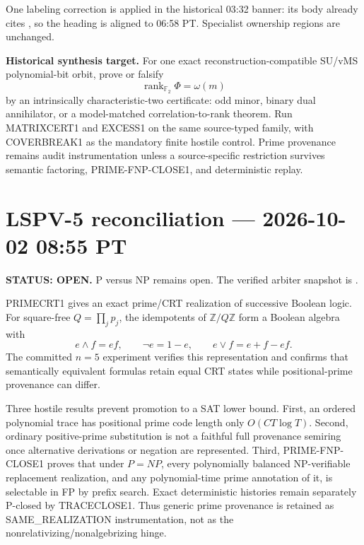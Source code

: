 \documentclass[11pt]{article}
\begin{document}
One labeling correction is applied in the historical 03:32 banner: its body already cites
, so the heading is aligned to 06:58 PT.
Specialist ownership regions are unchanged.

\begin{candidatebox}
\textbf{Historical synthesis target.}
For one exact reconstruction-compatible SU/vMS polynomial-bit orbit, prove or falsify
\[
\operatorname{rank}_{\mathbb F_2}\Phi=\omega(m)
\]
by an intrinsically characteristic-two certificate: odd minor, binary dual annihilator, or a
model-matched correlation-to-rank theorem. Run MATRIXCERT1 and EXCESS1 on the same source-typed
family, with COVERBREAK1 as the mandatory finite hostile control. Prime provenance remains audit
instrumentation unless a source-specific restriction survives semantic factoring,
PRIME-FNP-CLOSE1, and deterministic replay.
\end{candidatebox}


\section{LSPV-5 reconciliation --- 2026-10-02 08:55 PT}
\textbf{STATUS: OPEN.} P versus NP remains open. The verified arbiter snapshot is
.

PRIMECRT1 gives an exact prime/CRT realization of successive Boolean logic. For square-free
\(Q=\prod_jp_j\), the idempotents of \(\mathbb Z/Q\mathbb Z\) form a Boolean algebra with
\[
 e\wedge f=ef,\qquad \neg e=1-e,\qquad e\vee f=e+f-ef.
\]
The committed \(n=5\) experiment verifies this representation and confirms that semantically
equivalent formulas retain equal CRT states while positional-prime provenance can differ.

Three hostile results prevent promotion to a SAT lower bound. First, an ordered polynomial trace
has positional prime code length only \(O(CT\log T)\). Second, ordinary positive-prime
substitution is not a faithful full provenance semiring once alternative derivations or negation
are represented. Third, PRIME-FNP-CLOSE1 proves that under \(P=NP\), every polynomially balanced
NP-verifiable replacement realization, and any polynomial-time prime annotation of it, is
selectable in FP by prefix search. Exact deterministic histories remain separately P-closed by
TRACECLOSE1. Thus generic prime provenance is retained as SAME\_REALIZATION instrumentation,
not as the nonrelativizing/nonalgebrizing hinge.
\end{document}
